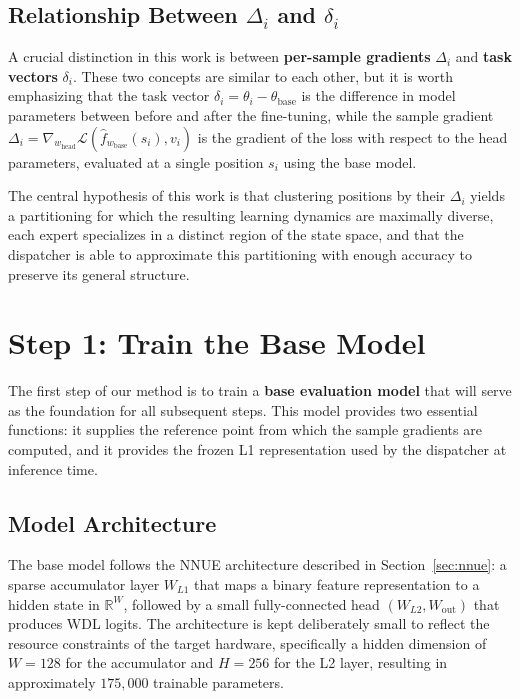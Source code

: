 \subsection{Relationship Between \texorpdfstring{\(\Delta_i\) and \(\delta_i\)}{Delta i and delta i}}\label{sec:delta-vs-task}

A crucial distinction in this work is between \textbf{per-sample gradients} \(\Delta_i\) and \textbf{task vectors} \(\delta_i\). These two concepts are similar to each other, but it is worth emphasizing that the task vector \(\delta_i = \theta_i - \theta_{\mathrm{base}}\) is the difference in model parameters between before and after the fine-tuning, while the sample gradient \(\Delta_i = \nabla_{w_{\mathrm{head}}} \mathcal{L}(\hat{f}_{w_{\mathrm{base}}}(s_i), v_i)\) is the gradient of the loss with respect to the head parameters, evaluated at a single position \(s_i\) using the base model.

The central hypothesis of this work is that clustering positions by their \(\Delta_i\) yields a partitioning for which the resulting learning dynamics are maximally diverse, each expert specializes in a distinct region of the state space, and that the dispatcher is able to approximate this partitioning with enough accuracy to preserve its general structure.

\section{Step 1: Train the Base Model}\label{sec:step-base}

The first step of our method is to train a \textbf{base evaluation model} that will serve as the foundation for all subsequent steps. This model provides two essential functions: it supplies the reference point from which the sample gradients are computed, and it provides the frozen L1 representation used by the dispatcher at inference time.

\subsection{Model Architecture}\label{sec:method-arch}

The base model follows the NNUE architecture described in Section~\ref{sec:nnue}: a sparse accumulator layer \(W_{L1}\) that maps a binary feature representation to a hidden state in \(\mathbb{R}^{W}\), followed by a small fully-connected head \((W_{L2}, W_{\mathrm{out}})\) that produces WDL logits. The architecture is kept deliberately small to reflect the resource constraints of the target hardware, specifically a hidden dimension of \(W = 128\) for the accumulator and \(H = 256\) for the L2 layer, resulting in approximately \(175{,}000\) trainable parameters.

